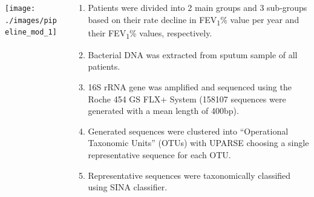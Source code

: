 \documentclass[10pt]{beamer}
\begin{document}
\iffondimod
\begin{frame}
	\small{%
	\begin{columns}
		\begin{column}{0.4\textwidth}
			\begin{center}
				\texttt{[image: ./images/pipeline\_mod\_1]}
			\end{center}
		\end{column}
		\begin{column}{0.6\textwidth}
			\begin{enumerate}
				\item Patients were divided into 2 main groups and 3 sub-groups based on their rate decline in FEV\textsubscript{1}\% value per year and their FEV\textsubscript{1}\% values, respectively.
				\item Bacterial DNA was extracted from sputum sample of all patients. 
				\item 16S rRNA gene was amplified and sequenced using the Roche 454 GS FLX+ System (158107 sequences were generated with a mean length of 400bp).
				\item Generated sequences were clustered into ``Operational Taxonomic Units'' (OTUs) with UPARSE choosing a single representative sequence for each OTU.
				\item Representative sequences were taxonomically classified using SINA classifier.
			\end{enumerate}
		\end{column}
	\end{columns}
	}
\end{frame}
\fi
\end{document}
